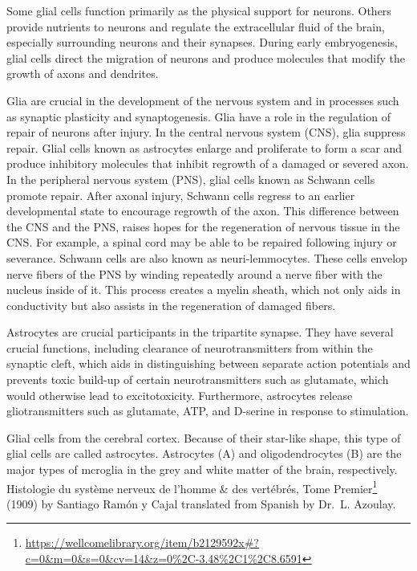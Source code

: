 \documentclass[]{book}
\let\rmarkdownfootnote\footnote%
\def\footnote{\protect\rmarkdownfootnote}
\renewcommand{\href}[2]{#2\footnote{\url{#1}}}
\begin{document}
Some glial cells function primarily as the physical support for neurons. Others provide nutrients to neurons and regulate the extracellular fluid of the brain, especially surrounding neurons and their synapses. During early embryogenesis, glial cells direct the migration of neurons and produce molecules that modify the growth of axons and dendrites.

Glia are crucial in the development of the nervous system and in processes such as synaptic plasticity and synaptogenesis. Glia have a role in the regulation of repair of neurons after injury. In the central nervous system (CNS), glia suppress repair. Glial cells known as astrocytes enlarge and proliferate to form a scar and produce inhibitory molecules that inhibit regrowth of a damaged or severed axon. In the peripheral nervous system (PNS), glial cells known as Schwann cells promote repair. After axonal injury, Schwann cells regress to an earlier developmental state to encourage regrowth of the axon. This difference between the CNS and the PNS, raises hopes for the regeneration of nervous tissue in the CNS. For example, a spinal cord may be able to be repaired following injury or severance. Schwann cells are also known as neuri-lemmocytes. These cells envelop nerve fibers of the PNS by winding repeatedly around a nerve fiber with the nucleus inside of it. This process creates a myelin sheath, which not only aids in conductivity but also assists in the regeneration of damaged fibers.

Astrocytes are crucial participants in the tripartite synapse. They have several crucial functions, including clearance of neurotransmitters from within the synaptic cleft, which aids in distinguishing between separate action potentials and prevents toxic build-up of certain neurotransmitters such as glutamate, which would otherwise lead to excitotoxicity. Furthermore, astrocytes release gliotransmitters such as glutamate, ATP, and D-serine in response to stimulation.

Glial cells from the cerebral cortex. Because of their star-like shape, this type of glial cells are called astrocytes. Astrocytes (A) and oligodendrocytes (B) are the major types of mcroglia in the grey and white matter of the brain, respectively. \href{https://wellcomelibrary.org/item/b2129592x\#?c=0\&m=0\&s=0\&cv=14\&z=0\%2C-3.48\%2C1\%2C8.6591}{Histologie du système nerveux de l'homme \& des vertébrés, Tome Premier} (1909) by Santiago Ramón y Cajal translated from Spanish by Dr.~L. Azoulay.
\end{document}
